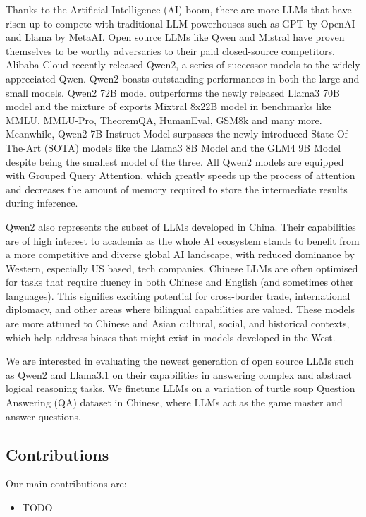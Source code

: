     Thanks to the Artificial Intelligence (AI) boom, there are more LLMs that have risen up to compete with traditional LLM powerhouses such as GPT by OpenAI and Llama by MetaAI. Open source LLMs like Qwen and Mistral have proven themselves to be worthy adversaries to their paid closed-source competitors. Alibaba Cloud recently released Qwen2, a series of successor models to the widely appreciated Qwen. Qwen2 boasts outstanding performances in both the large and small models. Qwen2 72B model outperforms the newly released Llama3 70B model and the mixture of exports Mixtral 8x22B model in benchmarks like MMLU, MMLU-Pro, TheoremQA, HumanEval, GSM8k and many more\cite{https://qwenlm.github.io/blog/qwen2/}. Meanwhile, Qwen2 7B Instruct Model surpasses the newly introduced State-Of-The-Art (SOTA) models like the Llama3 8B Model and the GLM4 9B Model despite being the smallest model of the three. All Qwen2 models are equipped with Grouped Query Attention, which greatly speeds up the process of attention and decreases the amount of memory required to store the intermediate results during inference.
    
    Qwen2 also represents the subset of LLMs developed in China. Their capabilities are of high interest to academia as the whole AI ecosystem stands to benefit from a more competitive and diverse global AI landscape, with reduced dominance by Western, especially US based, tech companies. Chinese LLMs are often optimised for tasks that require fluency in both Chinese and English (and sometimes other languages). This signifies exciting potential for cross-border trade, international diplomacy, and other areas where bilingual capabilities are valued. These models are more attuned to Chinese and Asian cultural, social, and historical contexts, which help address biases that might exist in models developed in the West.  

    We are interested in evaluating the newest generation of open source LLMs such as Qwen2 and Llama3.1 on their capabilities in answering complex and abstract logical reasoning tasks. We finetune LLMs on a variation of turtle soup Question Answering (QA) dataset in Chinese, where LLMs act as the game master and answer questions.
\subsection{Contributions}
Our main contributions are:
\begin{itemize}
    \item TODO
\end{itemize}
